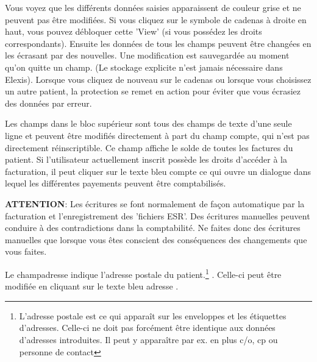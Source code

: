 Vous voyez que les différents données saisies apparaissent de couleur grise et ne peuvent pas être modifiées. Si vous cliquez sur le symbole de cadenas à droite en haut, vous pouvez débloquer cette 'View' (si vous possédez les droits correspondants). Ensuite les données de tous les champs peuvent être changées en les écrasant par des nouvelles. Une modification est sauvegardée au moment qu'on quitte un champ. (Le stockage explicite n'est jamais nécessaire dans Elexis). Lorsque vous cliquez de nouveau sur le cadenas ou lorsque vous choisissez un autre patient, la protection se remet en action pour éviter que vous écrasiez des données par erreur.

\medskip

Les champs dans le bloc supérieur sont tous des champs de texte d'une seule ligne et peuvent être modifiés directement à part du champ \glqq compte\grqq{}, qui n'est pas directement réinscriptible. Ce champ affiche le solde de toutes les factures du patient. Si l'utilisateur actuellement inscrit possède les droits d'accéder à la facturation, il peut cliquer sur le texte bleu \glqq compte\grqq{} ce qui ouvre un dialogue dans lequel les différentes payements peuvent être comptabilisés.

\textbf{ATTENTION}: Les écritures se font normalement de façon automatique par la facturation
et l'enregistrement des 'fichiers ESR'. Des écritures manuelles peuvent conduire à des contradictions dans la comptabilité. Ne faites donc des écritures manuelles que lorsque vous êtes conscient des conséquences des changements que vous faites.


 Le champ\glqq adresse\grqq{} indique l'adresse postale du patient.\footnote{L'adresse postale est ce qui apparaît sur les enveloppes et les étiquettes d'adresses. Celle-ci ne doit pas forcément être identique aux données d'adresses introduites. Il peut y apparaître par ex. en plus c/o, cp ou personne de contact} . Celle-ci peut être modifiée en cliquant sur le texte bleu \glqq adresse \grqq{}.

